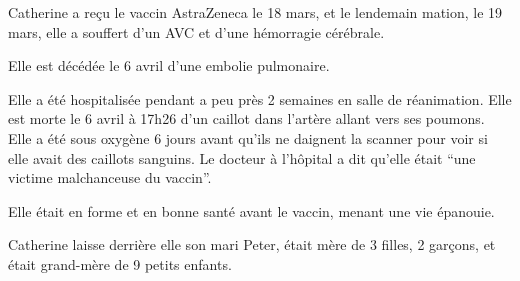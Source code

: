 Catherine a reçu le vaccin AstraZeneca le 18 mars, et le lendemain mation, le 19
mars, elle a souffert d'un AVC et d'une hémorragie cérébrale.

Elle est décédée le 6 avril d'une embolie pulmonaire.

Elle a été hospitalisée pendant a peu près 2 semaines en salle de
réanimation. Elle est morte le 6 avril à 17h26 d'un caillot dans l'artère allant
vers ses poumons. Elle a été sous oxygène 6 jours avant qu'ils ne daignent la
scanner pour voir si elle avait des caillots sanguins. Le docteur à l'hôpital a
dit qu'elle était “une victime malchanceuse du vaccin”.

Elle était en forme et en bonne santé avant le vaccin, menant une vie épanouie.

Catherine laisse derrière elle son mari Peter, était mère de 3 filles, 2
garçons, et était grand-mère de 9 petits enfants.

